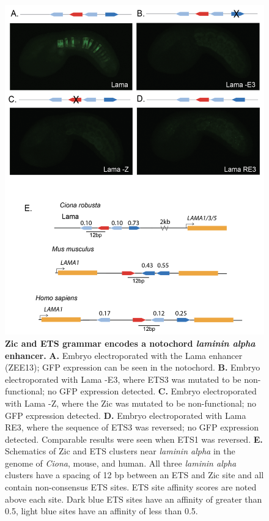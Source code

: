 \begin{figure}[p]
    \centering
    \includegraphics[scale=.52]{2_figures/Fig4_Laminin-alpha-Enhancer.png}
    \caption[Zic and ETS grammar encodes a notochord \textit{laminin alpha} enhancer]{\textbf{Zic and ETS grammar encodes a notochord \textit{laminin alpha} enhancer.} \textbf{A.} Embryo electroporated with the Lama enhancer (ZEE13); GFP expression can be seen in the notochord. \textbf{B.} Embryo electroporated with Lama -E3, where ETS3 was mutated to be non-functional; no GFP expression detected. \textbf{C.} Embryo electroporated with Lama -Z, where the Zic was mutated to be non-functional; no GFP expression detected. \textbf{D.} Embryo electroporated with Lama RE3, where the sequence of ETS3 was reversed; no GFP expression detected. Comparable results were seen when ETS1 was reversed. \textbf{E.} Schematics of Zic and ETS clusters near \textit{laminin alpha}  in the genome of \textit{Ciona}, mouse, and human. All three \textit{laminin alpha}  clusters have a spacing of 12 bp between an ETS and Zic site and all contain non-consensus ETS sites. ETS site affinity scores are noted above each site. Dark blue ETS sites have an affinity of greater than 0.5, light blue sites have an affinity of less than 0.5.}
    \label{fig:4 laminin alpha enhancer}
\end{figure}

